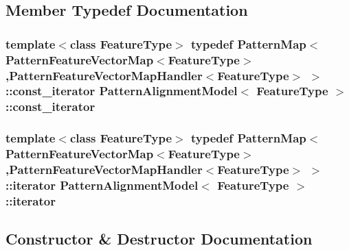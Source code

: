 \subsection{Member Typedef Documentation}
\hypertarget{classPatternAlignmentModel_ac8d8a6556af4672ceb0f29d7cfaa9db4}{}
\subsubsection[{const\+\_\+iterator}]{\setlength{\rightskip}{0pt plus 5cm}template$<$class Feature\+Type$>$ typedef {\bf Pattern\+Map}$<${\bf Pattern\+Feature\+Vector\+Map}$<$Feature\+Type$>$,{\bf Pattern\+Feature\+Vector\+Map\+Handler}$<$Feature\+Type$>$ $>$\+::{\bf const\+\_\+iterator} {\bf Pattern\+Alignment\+Model}$<$ Feature\+Type $>$\+::{\bf const\+\_\+iterator}}\label{classPatternAlignmentModel_ac8d8a6556af4672ceb0f29d7cfaa9db4}
\hypertarget{classPatternAlignmentModel_a108db1926176ea0b761a8329fc73e3e7}{}
\subsubsection[{iterator}]{\setlength{\rightskip}{0pt plus 5cm}template$<$class Feature\+Type$>$ typedef {\bf Pattern\+Map}$<${\bf Pattern\+Feature\+Vector\+Map}$<$Feature\+Type$>$,{\bf Pattern\+Feature\+Vector\+Map\+Handler}$<$Feature\+Type$>$ $>$\+::{\bf iterator} {\bf Pattern\+Alignment\+Model}$<$ Feature\+Type $>$\+::{\bf iterator}}\label{classPatternAlignmentModel_a108db1926176ea0b761a8329fc73e3e7}


\subsection{Constructor \& Destructor Documentation}
\hypertarget{classPatternAlignmentModel_ae3bc572f6931c070eda7532f7f38cffb}{}
